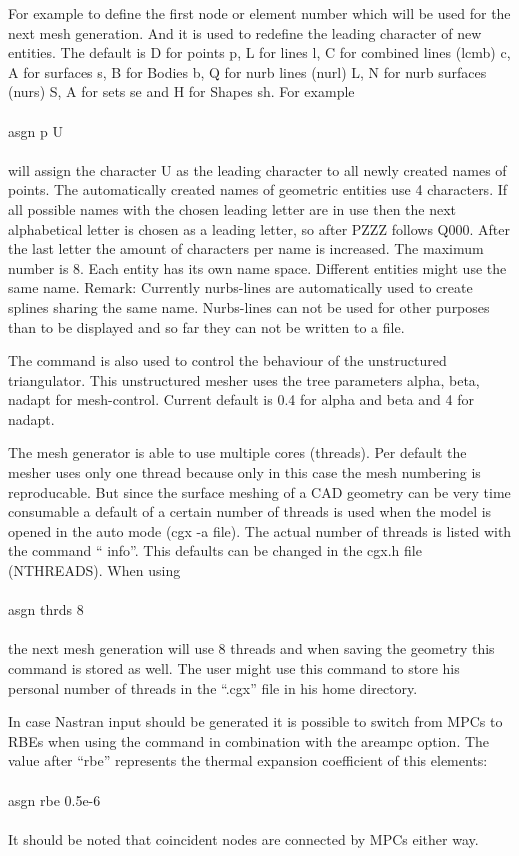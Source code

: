 \documentclass{article}
\begin{document}
For example to define the first node or element number which will be used for the next mesh generation. And it is used to redefine the leading character of new entities. The default is D for points p, L for lines l, C for combined lines (lcmb) c, A for surfaces s, B for Bodies b, Q for nurb lines (nurl) L, N for nurb surfaces (nurs) S, A for sets se and H for Shapes sh. For example\\\\asgn p U\\\\will assign the character U as the leading character to all newly created names of points. The automatically created names of geometric entities use 4 characters. If all possible names with the chosen leading letter are in use then the next alphabetical letter is chosen as a leading letter, so after PZZZ follows Q000. After the last letter the amount of characters per name is increased. The maximum number is 8. Each entity has its own name space. Different entities might use the same name. Remark: Currently nurbs-lines are automatically used to create splines sharing the same name. Nurbs-lines can not be used for other purposes than to be displayed and so far they can not be written to a file.

The command is also used to control the behaviour of the unstructured triangulator. This unstructured mesher \cite{mesh2d} uses the tree parameters alpha, beta, nadapt for mesh-control. Current default is 0.4 for alpha and beta and 4 for nadapt.

The mesh generator is able to use multiple cores (threads). Per default the mesher uses only one thread because only in this case the mesh numbering is reproducable. But since the surface meshing of a CAD geometry can be very time consumable a default of a certain number of threads is used when the model is opened in the auto mode (cgx -a file). The actual number of threads is listed with the command `` info''. This defaults can be changed in the cgx.h file (NTHREADS). When using\\\\asgn thrds 8\\\\the next mesh generation will use 8 threads and when saving the geometry this command is stored as well. The user might use this command to store his personal number of threads in the ``.cgx'' file in his home directory.

In case Nastran input should be generated it is possible to switch from MPCs to RBEs when using the  command in combination with the areampc option. The value after ``rbe'' represents the thermal expansion coefficient of this elements:\\\\asgn rbe 0.5e-6\\\\It should be noted that coincident nodes are connected by MPCs either way.
  
\end{document}
